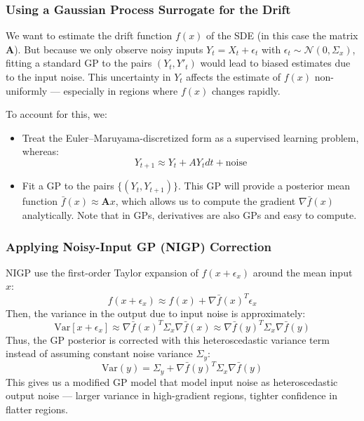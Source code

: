 \documentclass[a4paper, 11pt]{article}
\begin{document}
\begin{sloppypar}
\subsubsection{Using a Gaussian Process Surrogate for the Drift}
We want to estimate the drift function $f(x)$ of the SDE (in this case the matrix $\mathbf{A}$).
But because we only observe noisy inputs $Y_t = X_t + \epsilon_t$ with $\epsilon_t \sim \mathcal{N}(0, \Sigma_x)$,
fitting a standard GP to the pairs $(Y_t, Y'_t)$ would lead to biased estimates due to the input
noise. This uncertainty in $Y_t$ affects the estimate of $f(x)$ non-uniformly — especially in regions
where $f(x)$ changes rapidly.

To account for this, we:
\begin{itemize}
  \item Treat the Euler–Maruyama-discretized form as a supervised learning problem, whereas:
        \[
          Y_{t+1} \approx Y_t + AY_tdt + \text{noise}
        \]
  \item Fit a GP to the pairs $\{(Y_t, Y_{t+1})\}$. This GP will provide a posterior mean function
        $\bar{f}(x) \approx \mathbf{A}x$, which allows us to compute the gradient $\nabla \bar{f}(x)$
        analytically. Note that in GPs, derivatives are also GPs and easy to compute.
\end{itemize}

\subsubsection{Applying Noisy-Input GP (NIGP) Correction}
NIGP use the first-order Taylor expansion of $f(x + \epsilon_x)$ around the mean input $x$:
\[
  f(x + \epsilon_x) \approx f(x) + \nabla\bar{f}(x)^T \epsilon_x
\]
Then, the variance in the output due to input noise is approximately:
\[
  \text{Var}[x + \epsilon_x] \approx \nabla\bar{f}(x)^T \Sigma_x \nabla\bar{f}(x) \approx \nabla\bar{f}(y)^T \Sigma_x \nabla\bar{f}(y)
\]
Thus, the GP posterior is corrected with this heteroscedastic variance term instead of assuming
constant noise variance $\Sigma_y$:
\[
  \text{Var}(y) = \Sigma_y + \nabla\bar{f}(y)^T \Sigma_x \nabla\bar{f}(y)
\]
This gives us a modified GP model that model input noise as heteroscedastic output noise — larger
variance in high-gradient regions, tighter confidence in flatter regions.


\end{sloppypar}
\end{document}
